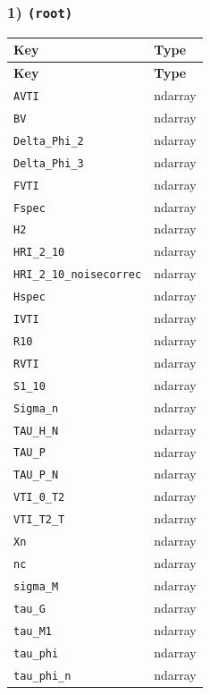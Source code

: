 \documentclass[11pt]{article}
\begin{document}
\subsubsection*{1) \texttt{(root)}}
\begin{longtable}{|p{}|p{}|}
\hline
\textbf{Key} & \textbf{Type} \\ \hline
\endfirsthead
\hline
\textbf{Key} & \textbf{Type} \\ \hline
\endhead
\texttt{AVTI} & ndarray \\ \hline
\texttt{BV} & ndarray \\ \hline
\texttt{Delta\_\allowbreak{}Phi\_\allowbreak{}2} & ndarray \\ \hline
\texttt{Delta\_\allowbreak{}Phi\_\allowbreak{}3} & ndarray \\ \hline
\texttt{FVTI} & ndarray \\ \hline
\texttt{Fspec} & ndarray \\ \hline
\texttt{H2} & ndarray \\ \hline
\texttt{HRI\_\allowbreak{}2\_\allowbreak{}10} & ndarray \\ \hline
\texttt{HRI\_\allowbreak{}2\_\allowbreak{}10\_\allowbreak{}noisecorrec} & ndarray \\ \hline
\texttt{Hspec} & ndarray \\ \hline
\texttt{IVTI} & ndarray \\ \hline
\texttt{R10} & ndarray \\ \hline
\texttt{RVTI} & ndarray \\ \hline
\texttt{S1\_\allowbreak{}10} & ndarray \\ \hline
\texttt{Sigma\_\allowbreak{}n} & ndarray \\ \hline
\texttt{TAU\_\allowbreak{}H\_\allowbreak{}N} & ndarray \\ \hline
\texttt{TAU\_\allowbreak{}P} & ndarray \\ \hline
\texttt{TAU\_\allowbreak{}P\_\allowbreak{}N} & ndarray \\ \hline
\texttt{VTI\_\allowbreak{}0\_\allowbreak{}T2} & ndarray \\ \hline
\texttt{VTI\_\allowbreak{}T2\_\allowbreak{}T} & ndarray \\ \hline
\texttt{Xn} & ndarray \\ \hline
\texttt{nc} & ndarray \\ \hline
\texttt{sigma\_\allowbreak{}M} & ndarray \\ \hline
\texttt{tau\_\allowbreak{}G} & ndarray \\ \hline
\texttt{tau\_\allowbreak{}M1} & ndarray \\ \hline
\texttt{tau\_\allowbreak{}phi} & ndarray \\ \hline
\texttt{tau\_\allowbreak{}phi\_\allowbreak{}n} & ndarray \\ \hline
\end{longtable}
\end{document}
